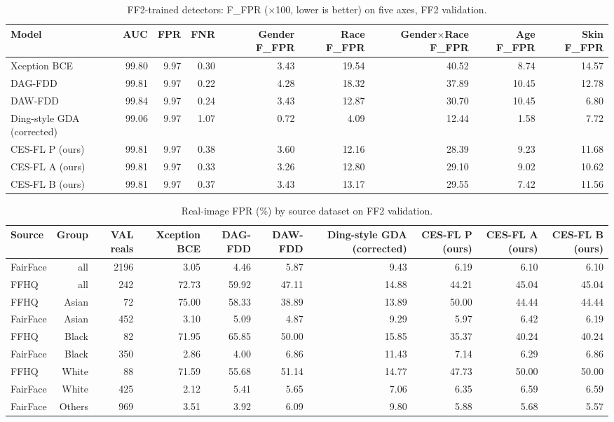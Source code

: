 \begin{table}[t]\centering\small
\caption{FF2-trained detectors: F\_FPR ($\times$100, lower is better) on five axes, FF2 validation.}\label{tab:ff2_ffpr_axes}
\begin{tabular}{lrrrrrrrr}
\toprule
Model & AUC & FPR & FNR & Gender F\_FPR & Race F\_FPR & Gender$\times$Race F\_FPR & Age F\_FPR & Skin F\_FPR \\
\midrule
Xception BCE & 99.80 & 9.97 & 0.30 & 3.43 & 19.54 & 40.52 & 8.74 & 14.57 \\
DAG-FDD & 99.81 & 9.97 & 0.22 & 4.28 & 18.32 & 37.89 & 10.45 & 12.78 \\
DAW-FDD & 99.84 & 9.97 & 0.24 & 3.43 & 12.87 & 30.70 & 10.45 & 6.80 \\
Ding-style GDA (corrected) & 99.06 & 9.97 & 1.07 & 0.72 & 4.09 & 12.44 & 1.58 & 7.72 \\
CES-FL P (ours) & 99.81 & 9.97 & 0.38 & 3.60 & 12.16 & 28.39 & 9.23 & 11.68 \\
CES-FL A (ours) & 99.81 & 9.97 & 0.33 & 3.26 & 12.80 & 29.10 & 9.02 & 10.62 \\
CES-FL B (ours) & 99.81 & 9.97 & 0.37 & 3.43 & 13.17 & 29.55 & 7.42 & 11.56 \\
\bottomrule
\end{tabular}
\end{table}

\begin{table}[t]\centering\small
\caption{Real-image FPR (\%) by source dataset on FF2 validation.}\label{tab:ff2_source}
\begin{tabular}{lrrrrrrrrr}
\toprule
Source & Group & VAL reals & Xception BCE & DAG-FDD & DAW-FDD & Ding-style GDA (corrected) & CES-FL P (ours) & CES-FL A (ours) & CES-FL B (ours) \\
\midrule
FairFace & all & 2196 & 3.05 & 4.46 & 5.87 & 9.43 & 6.19 & 6.10 & 6.10 \\
FFHQ & all & 242 & 72.73 & 59.92 & 47.11 & 14.88 & 44.21 & 45.04 & 45.04 \\
FFHQ & Asian & 72 & 75.00 & 58.33 & 38.89 & 13.89 & 50.00 & 44.44 & 44.44 \\
FairFace & Asian & 452 & 3.10 & 5.09 & 4.87 & 9.29 & 5.97 & 6.42 & 6.19 \\
FFHQ & Black & 82 & 71.95 & 65.85 & 50.00 & 15.85 & 35.37 & 40.24 & 40.24 \\
FairFace & Black & 350 & 2.86 & 4.00 & 6.86 & 11.43 & 7.14 & 6.29 & 6.86 \\
FFHQ & White & 88 & 71.59 & 55.68 & 51.14 & 14.77 & 47.73 & 50.00 & 50.00 \\
FairFace & White & 425 & 2.12 & 5.41 & 5.65 & 7.06 & 6.35 & 6.59 & 6.59 \\
FairFace & Others & 969 & 3.51 & 3.92 & 6.09 & 9.80 & 5.88 & 5.68 & 5.57 \\
\bottomrule
\end{tabular}
\end{table}
